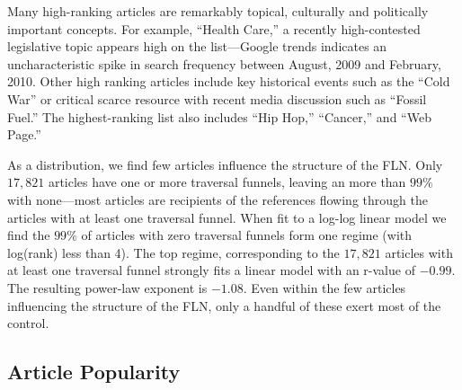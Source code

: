 \documentclass[pre,twocolumn,twoside,superscriptaddress,floatfix, aps, 10pt]{revtex4-1}
\begin{document}
Many high-ranking articles are remarkably topical, culturally and politically important concepts.  For example, ``Health Care,'' a recently high-contested legislative topic appears high on the list---Google trends indicates an uncharacteristic spike in search frequency between August, 2009 and February, 2010.
Other high ranking articles include key historical events such as the ``Cold War'' or critical scarce resource with recent 
media discussion such as ``Fossil Fuel.'' 
The highest-ranking list also includes ``Hip Hop,'' ``Cancer,'' and ``Web Page.''

As a distribution, we find few articles influence the structure of the 
FLN. Only $17, 821$ articles have one or more traversal funnels, leaving
an more than $99\%$ with none---most articles are recipients of 
the references flowing through the articles with at least one traversal funnel.
When fit to a log-log linear model we find the $99\%$ of articles with zero
traversal funnels form one regime (with log(rank) less than 4).
The top regime, corresponding to the $17, 821$ articles with at least one 
traversal funnel strongly fits a linear model with an r-value of $-0.99$. 
The resulting power-law exponent is $-1.08$. Even within the few articles
influencing the structure of the FLN, only a handful of these exert most of the 
control. 

\subsection{Article Popularity}
\end{document}
